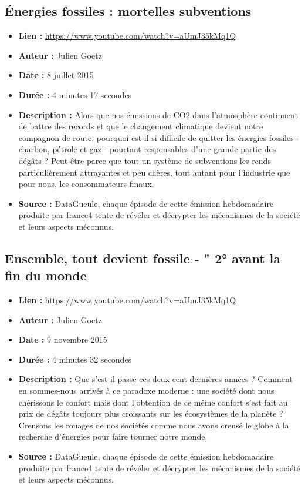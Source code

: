 \documentclass[8pt]{article}
\begin{document}
\subsection{Énergies fossiles : mortelles subventions}
\begin{itemize}
	\item \textbf{Lien : }  \url{https://www.youtube.com/watch?v=aUmJ35kMq1Q} 
	\item \textbf{Auteur : } Julien Goetz
	\item \textbf{Date : } 8 juillet 2015
	\item \textbf{Durée : } 4 minutes 17 secondes
	\item \textbf{Description : } Alors que nos émissions de CO2 dans l'atmosphère continuent de battre des records et que le changement climatique devient notre compagnon de route, pourquoi est-il si difficile de quitter les énergies fossiles - charbon, pétrole et gaz - pourtant responsables d'une grande partie des dégâts ? Peut-être parce que tout un système de subventions les rends particulièrement attrayantes et peu chères, tout autant pour l'industrie que pour nous, les consommateurs finaux. 
	\item \textbf{Source : } DataGueule, chaque épisode de cette émission hebdomadaire produite par france4 tente de révéler et décrypter les mécanismes de la société et leurs aspects méconnus.
\end{itemize}

\subsection{Ensemble, tout devient fossile - " 2° avant la fin du monde}
\begin{itemize}
	\item \textbf{Lien : }  \url{https://www.youtube.com/watch?v=aUmJ35kMq1Q} 
	\item \textbf{Auteur : } Julien Goetz
	\item \textbf{Date : } 9 novembre 2015
	\item \textbf{Durée : } 4 minutes 32 secondes
	\item \textbf{Description : } Que s’est-il passé ces deux cent dernières années ? Comment en sommes-nous arrivés à ce paradoxe moderne : une société dont nous chérissons le confort mais dont l’obtention de ce même confort s’est fait au prix de dégâts toujours plus croissants sur les écosystèmes de la planète ? Creusons les rouages de nos sociétés comme nous avons creusé le globe à la recherche d’énergies pour faire tourner notre monde.
	\item \textbf{Source : } DataGueule, chaque épisode de cette émission hebdomadaire produite par france4 tente de révéler et décrypter les mécanismes de la société et leurs aspects méconnus.
\end{itemize}
\end{document}
